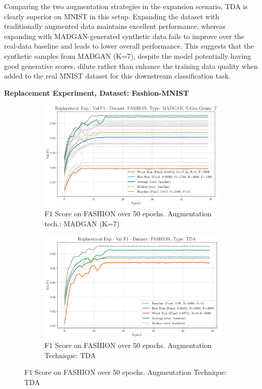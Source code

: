 Comparing the two augmentation strategies in the expansion scenario, TDA is clearly superior on MNIST in this setup. Expanding the dataset with traditionally augmented data maintains excellent performance, whereas expanding with MADGAN-generated synthetic data fails to improve over the real-data baseline and leads to lower overall performance. This suggests that the synthetic samples from MADGAN (K=7), despite the model potentially having good generative scores, dilute rather than enhance the training data quality when added to the real MNIST dataset for this downstream classification task.


\newpage
\noindent\textbf{Replacement Experiment, Dataset: Fashion-MNIST}
\begin{figure}[H]
	\centering
	\begin{subfigure}{.85\textwidth}
		\includegraphics[width=\textwidth]{abb/strat_classifier_performance/FASHION_STRATIFIED_CLASSIFIERS_MADGAN_NEW/replacement_experiments/val_f1_score_MADGAN_FASHION_n_gen_7_all.png}
		\caption{F1 Score on FASHION over 50 epochs. Augmentation tech.: MADGAN (K=7)}
        \label{fig:res_replacement_fashion_tda_vs_madgan__madgan}
	\end{subfigure}
	\begin{subfigure}{.85\textwidth}
		\includegraphics[width=\textwidth]{abb/strat_classifier_performance/tda_fashion_mnist/replacement_experiments/val_f1_score_tda_fashion_mnist_fashion_all.png}
		\caption{F1 Score on FASHION over 50 epochs. Augmentation Technique: TDA}
        \label{fig:res_replacement_fashion_tda_vs_madgan__tda}
	\end{subfigure}
\end{figure}

